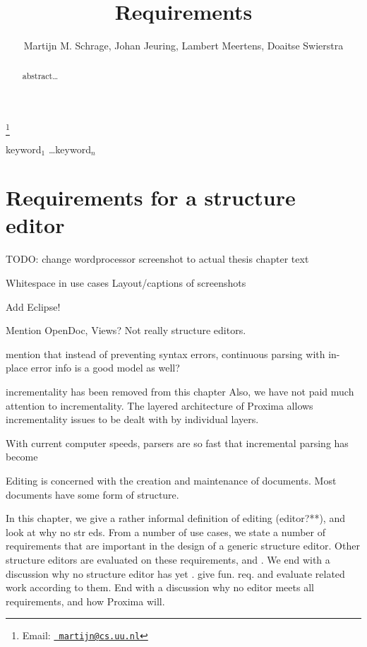\documentclass{entcs}
\begin{document}
\begin{frontmatter}
  \title{Requirements} 
  \author{Martijn M. Schrage, Johan Jeuring, Lambert Meertens, Doaitse Swierstra}
  \address{Institute of Information and Computing Sciences\\ Utrecht University\\
    Utrecht, The Netherlands} 
    \thanks[myemail]{Email:
    \href{mailto:martijn@cs.uu.nl} {\texttt{\normalshape
        martijn@cs.uu.nl}}} 
\begin{abstract} 
  abstract\dots
\end{abstract}
\begin{keyword}
  keyword$_1$ \dots keyword$_n$
\end{keyword}
\end{frontmatter}

\section{Requirements for a structure editor} \label{chap:requirements}



\bc

TODO: change wordprocessor screenshot to actual thesis chapter text

Whitespace in use cases
Layout/captions of screenshots

Add Eclipse!





Mention OpenDoc, Views? Not really structure editors.

mention that instead of preventing syntax errors, continuous parsing with in-place error 
info is a good model as well?

incrementality  has been removed from this chapter
Also, we have not paid much attention to incrementality. The layered architecture of Proxima allows incrementality issues to be dealt with by individual layers. 

With current computer speeds, parsers are so fast that incremental parsing has become %
\ec

\bc
Editing is concerned with the creation and maintenance of documents.  
Most documents have some form of structure. 

In this chapter, we give a rather informal definition of editing (editor?**), and look at why no str eds. From a number of use cases, we state a number of requirements that are important in the design of a generic structure editor. Other structure editors are evaluated on these requirements, and . We end with a discussion why no structure editor has yet .  give fun. req. and evaluate related work according to them. End with a discussion why no editor meets all requirements, and how Proxima will.
\ec
\end{document}
